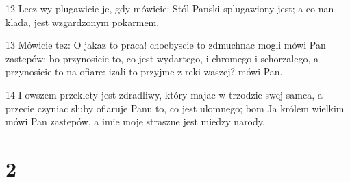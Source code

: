 \par 12 Lecz wy plugawicie je, gdy mówicie: Stól Panski splugawiony jest; a co nan klada, jest wzgardzonym pokarmem.
\par 13 Mówicie tez: O jakaz to praca! chocbyscie to zdmuchnac mogli mówi Pan zastepów; bo przynosicie to, co jest wydartego, i chromego i schorzalego, a przynosicie to na ofiare: izali to przyjme z reki waszej? mówi Pan.
\par 14 I owszem przeklety jest zdradliwy, który majac w trzodzie swej samca, a przecie czyniac sluby ofiaruje Panu to, co jest ulomnego; bom Ja królem wielkim mówi Pan zastepów, a imie moje straszne jest miedzy narody.

\chapter{2}

